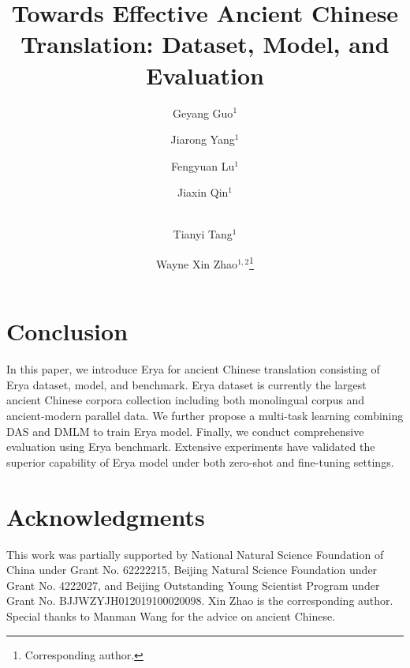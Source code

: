 \documentclass[runningheads]{llncs}
\begin{document}
%
\title{Towards Effective Ancient Chinese Translation: Dataset, Model, and Evaluation}
%
%
\author{Geyang Guo$^1$ \and
Jiarong Yang$^1$ \and
Fengyuan Lu$^1$ \and
Jiaxin Qin$^1$ \and
\\Tianyi Tang$^1$ \and
Wayne Xin Zhao$^{1,2}$\thanks{Corresponding author.}}
%
%
%
\maketitle              %
%

%
%
%











\section{Conclusion}
In this paper, we introduce Erya for ancient Chinese translation consisting of Erya dataset, model, and benchmark.
Erya dataset is currently the largest ancient Chinese corpora collection including both monolingual corpus and ancient-modern parallel data. 
We further propose a multi-task learning combining DAS and DMLM 
 to train Erya model. 
Finally, we conduct comprehensive evaluation using Erya benchmark. Extensive experiments have validated the superior capability of Erya model under both zero-shot and fine-tuning settings. 


\section*{Acknowledgments}
This work was partially supported by National Natural Science Foundation of China under Grant No. 62222215, Beijing Natural Science Foundation under Grant No. 4222027, and Beijing Outstanding Young Scientist Program under Grant No. BJJWZYJH012019100020098. Xin Zhao is the corresponding author. Special thanks to Manman Wang for the advice on ancient Chinese.


\printbibliography
\end{document}
